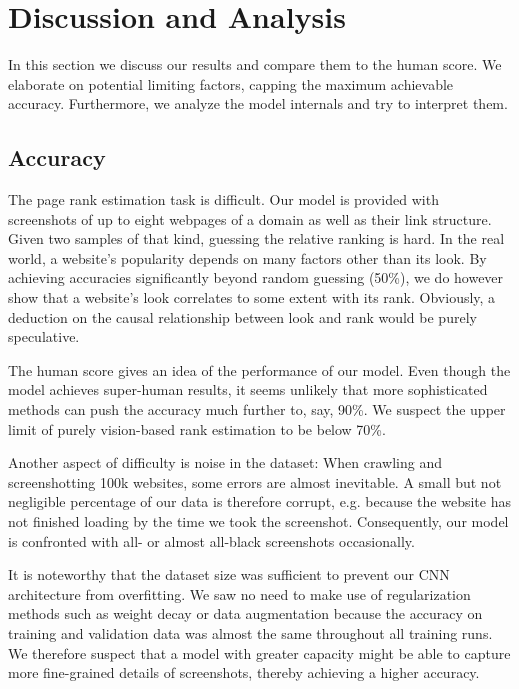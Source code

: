 \section{Discussion and Analysis}

In this section we discuss our results and compare them to the human score. We elaborate on potential limiting factors, capping the maximum achievable accuracy. Furthermore, we analyze the model internals and try to interpret them.

\subsection{Accuracy}

The page rank estimation task is difficult. Our model is provided with screenshots of up to eight webpages of a domain as well as their link structure. Given two samples of that kind, guessing the relative ranking is hard. In the real world, a website's popularity depends on many factors other than its look. By achieving accuracies significantly beyond random guessing (50\%), we do however show that a website's look correlates to some extent with its rank. Obviously, a deduction on the causal relationship between look and rank would be purely speculative.

The human score gives an idea of the performance of our model. Even though the model achieves super-human results, it seems unlikely that more sophisticated methods can push the accuracy much further to, say, 90\%. We suspect the upper limit of purely vision-based rank estimation to be below 70\%.

Another aspect of difficulty is noise in the dataset: When crawling and screenshotting 100k websites, some errors are almost inevitable. A small but not negligible percentage of our data is therefore corrupt, e.g. because the website has not finished loading by the time we took the screenshot. Consequently, our model is confronted with all- or almost all-black screenshots occasionally.

It is noteworthy that the dataset size was sufficient to prevent our CNN architecture from overfitting. We saw no need to make use of regularization methods such as weight decay or data augmentation because the accuracy on training and validation data was almost the same throughout all training runs. We therefore suspect that a model with greater capacity might be able to capture more fine-grained details of screenshots, thereby achieving a higher accuracy.


